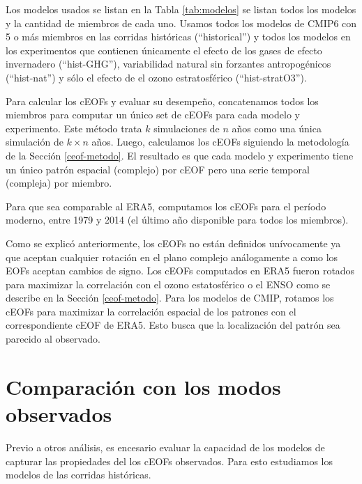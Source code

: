 \documentclass[12pt,oneside]{reedthesis}
\begin{document}
Los modelos usados se listan en la Tabla \ref{tab:modelos} se listan todos los modelos y la cantidad de miembros de cada uno.
Usamos todos los modelos de CMIP6 con 5 o más miembros en las corridas históricas (``historical'') y todos los modelos en los experimentos que contienen únicamente el efecto de los gases de efecto invernadero (``hist-GHG''), variabilidad natural sin forzantes antropogénicos (``hist-nat'') y sólo el efecto de el ozono estratosférico (``hist-stratO3'').

Para calcular los cEOFs y evaluar su desempeño, concatenamos todos los miembros para computar un único set de cEOFs para cada modelo y experimento.
Este método trata \(k\) simulaciones de \(n\) años como una única simulación de \(k\times n\) años.
Luego, calculamos los cEOFs siguiendo la metodología de la Sección \ref{ceof-metodo}.
El resultado es que cada modelo y experimento tiene un único patrón espacial (complejo) por cEOF pero una serie temporal (compleja) por miembro.

Para que sea comparable al ERA5, computamos los cEOFs para el período moderno, entre 1979 y 2014 (el último año disponible para todos los miembros).

Como se explicó anteriormente, los cEOFs no están definidos unívocamente ya que aceptan cualquier rotación en el plano complejo análogamente a como los EOFs aceptan cambios de signo.
Los cEOFs computados en ERA5 fueron rotados para maximizar la correlación con el ozono estatosférico o el ENSO como se describe en la Sección \ref{ceof-metodo}.
Para los modelos de CMIP, rotamos los cEOFs para maximizar la correlación espacial de los patrones con el correspondiente cEOF de ERA5.
Esto busca que la localización del patrón sea parecido al observado.

\hypertarget{comparaciuxf3n-con-los-modos-observados}{%
\section{Comparación con los modos observados}\label{comparaciuxf3n-con-los-modos-observados}}

Previo a otros análisis, es encesario evaluar la capacidad de los modelos de capturar las propiedades del los cEOFs observados.
Para esto estudiamos los modelos de las corridas históricas.
\end{document}
